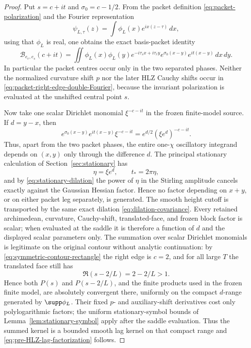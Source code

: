 \begin{proof}
Put $s=c+it$ and $\sigma_0=c-1/2$.  From the packet definition
\eqref{eq:packet-polarization} and the Fourier representation
\[
\psi_{L,\tau}(z)=\int\phi_L(x)e^{ix(z-\tau)}\,dx,
\]
using that $\phi_L$ is real, one obtains the exact basis-packet identity
\begin{equation}
\mathcal B_{e_r,e_s}(c+it)
 =\iint\phi_L(x)\phi_L(y)e^{-i\tau_sx+i\tau_ry}
 e^{\sigma_0(x-y)}e^{it(x-y)}\,dx\,dy .
\label{eq:packet-right-edge-double-Fourier}
\end{equation}
In particular the packet centres occur only in the two separated phases.
Neither the normalized curvature shift $p$ nor the later HLZ Cauchy shifts
occur in \eqref{eq:packet-right-edge-double-Fourier}, because the invariant
polarization is evaluated at the unshifted central point $s$.

Now take one scalar Dirichlet monomial $\xi^{-c-it}$ in the frozen finite-model
source.  If $d=y-x$, then
\begin{equation}
 e^{\sigma_0(x-y)}e^{it(x-y)}\xi^{-c-it}
 =e^{d/2}(\xi e^d)^{-c-it}.
\label{eq:packet-lag-one-chi}
\end{equation}
Thus, apart from the two packet phases, the entire one-$\chi$ oscillatory
integrand depends on $(x,y)$ only through the difference $d$.  The principal
stationary calculation of Section~\ref{sec:stationary} has
\[
\eta=\xi e^d,
\qquad t_*=2\pi\eta,
\]
and by \eqref{eq:stationary-dilation} the power of $\eta$ in the Stirling
amplitude cancels exactly against the Gaussian Hessian factor.  Hence no
factor depending on $x+y$, or on either packet leg separately, is generated.
The smooth height cutoff is transported by the same exact dilation
\eqref{eq:dilation-covariance}.  Every retained archimedean, curvature,
Cauchy-shift, translated-face, and frozen block factor is scalar; when evaluated
at the saddle it is therefore a function of $d$ and the displayed scalar
parameters only.  The summation over scalar Dirichlet monomials is legitimate
on the original contour without analytic continuation: by
\eqref{eq:symmetric-contour-rectangle} the right edge is $c=2$, and for all
large $T$ the translated face still has
\[
\Re(s-2/L)=2-2/L>1.
\]
Hence both $P(s)$ and $P(s-2/L)$, and the finite products used in the frozen
finite model, are absolutely convergent there, uniformly on the compact
$d$-range generated by $\supp\phi_L$.  Their fixed $p$- and auxiliary-shift
derivatives cost only polylogarithmic factors; the uniform stationary-symbol
bounds of Lemma~\ref{lem:stationary-symbol} apply after the saddle evaluation.
Thus the summed kernel is a bounded smooth lag kernel on that compact range and
\eqref{eq:pre-HLZ-lag-factorization} follows.


\end{proof}
